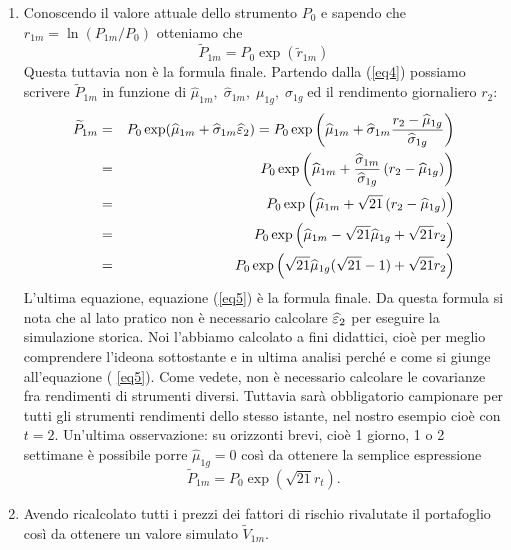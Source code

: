 \documentclass[a4paper,12pt]{article}
\begin{document}
\begin{enumerate}
\begin{enumerate}
\begin{enumerate}
\item  Conoscendo il valore attuale dello strumento $P_{0}$ e sapendo che $%
r_{1m}=\ln \left( P_{1m}/P_{0}\right) $ otteniamo che
\begin{equation}
\widetilde{P}_{1m}=P_{0}\exp (\widetilde{r}_{1m})  \label{eq4}
\end{equation}
Questa tuttavia non \`{e} la formula finale. Partendo dalla (\ref{eq4})
possiamo scrivere $\widetilde{P}_{1m}$ in funzione di $\widehat{\mu }_{1m},\;%
\widehat{\sigma }_{1m},\;\mu _{1g},\;\sigma _{1g}\;$ed il rendimento
giornaliero $r_{2}:$%
\begin{eqnarray}
\widetilde{P}_{1m} &=&P_{0}\exp (\widehat{\mu }_{1m}+\widehat{\sigma }_{1m}%
\widehat{\varepsilon }_{2})=P_{0}\exp \left( \widehat{\mu }_{1m}+\widehat{%
\sigma }_{1m}\frac{r_{2}-\widehat{\mu }_{1g}}{\widehat{\sigma }_{1g}}\right) 
\nonumber \\
&=&P_{0}\exp \left( \widehat{\mu }_{1m}+\frac{\widehat{\sigma }_{1m}}{%
\widehat{\sigma }_{1g}}\left( r_{2}-\widehat{\mu }_{1g}\right) \right)  
\nonumber \\
&=&P_{0}\exp \left( \widehat{\mu }_{1m}+\sqrt{21}\left( r_{2}-\widehat{\mu }%
_{1g}\right) \right)   \nonumber \\
&=&P_{0}\exp \left( \widehat{\mu }_{1m}-\sqrt{21}\widehat{\mu }_{1g}+\sqrt{21%
}r_{2}\right)   \nonumber \\
&=&P_{0}\exp \left( \sqrt{21}\widehat{\mu }_{1g}(\sqrt{21}-1)+\sqrt{21}%
r_{2}\right)   \label{eq5}
\end{eqnarray}
L'ultima equazione, equazione (\ref{eq5}) \`{e} la formula finale. Da questa
formula si nota che al lato pratico non \`{e} necessario calcolare $\widehat{%
\varepsilon }_{2}$ per eseguire la simulazione storica. Noi l'abbiamo
calcolato a fini didattici, cio\`{e} per meglio comprendere l'ideona
sottostante e in ultima analisi perch\'{e} e come si giunge all'equazione (%
\ref{eq5}). Come vedete, non \`{e} necessario calcolare le covarianze fra
rendimenti di strumenti diversi. Tuttavia sar\`{a} obbligatorio campionare
per tutti gli strumenti rendimenti dello stesso istante, nel nostro esempio 
cio\`{e} con $t=2.$
Un'ultima osservazione: su orizzonti brevi, cio\`{e} 1 giorno, 1 o 2
settimane \`{e} possibile porre $\widehat{\mu }_{1g}=0$ cos\`{i} da ottenere
la semplice espressione
\[
\widetilde{P}_{1m}=P_{0}\exp \left( \sqrt{21}r_{t}\right) .
\]

\item  Avendo ricalcolato tutti i prezzi dei fattori di rischio rivalutate
il portafoglio cos\`{i} da ottenere un valore simulato $\widetilde{V}_{1m}$.


\end{enumerate}
\end{enumerate}
\end{enumerate}
\end{document}
